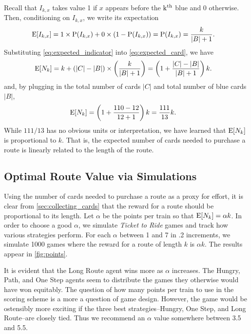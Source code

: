 Recall that $I_{k,x}$ takes value 1 if $x$ appears before the 
$\operatorname{k^{th}}$ blue and 0 otherwise.
Then, conditioning on $I_{k,x}$, we write its expectation
\begin{align} \label{eq:expected_indicator}
    \operatorname{\mathrm{E}}[I_{k,x}] &= 1 \times \operatorname{\mathrm{P}}(I_{k,x})
    + 0 \times (1-\operatorname{\mathrm{P}}(I_{k,x})) 
    =\operatorname{\mathrm{P}}(I_{k,x}) = \frac{k}{|B| + 1}.
\end{align}
Substituting \cref{eq:expected_indicator} into
\cref{eq:expected_card},
we have
\begin{align}
    \operatorname{\mathrm{E}}[N_k] &= k + \left( |C| - |B| \right) 
    \times \left(\frac{k}{|B| + 1}\right)
    = \left(1 + \frac{|C| - |B|}{|B| + 1} \right)k. \nonumber
\end{align}
and, by plugging in the total number of cards
$|C|$ and total number of blue cards $|B|$,
\begin{align}
    \operatorname{\mathrm{E}}[N_k] &= \left(1 + \frac{110 - 12}{12 + 1} \right)k
    = \frac{111}{13}k. \nonumber
\end{align}
While  $111/13$ has no obvious units or interpretation,
we have learned that $\operatorname{\mathrm{E}}[N_k]$ is proportional to $k$.
That is, the expected number of cards needed to
purchase a route is linearly related to the length of the route.

\subsection{Optimal Route Value via Simulations}
\label{sec:alpha}
Using the number of cards needed to purchase a route 
as a proxy for effort, it is clear from \cref{sec:collecting_cards}
that the reward for a route should be proportional to
its length.
Let $\alpha$ be the points per train
so that $\operatorname{\mathrm{E}}[N_k] = \alpha k$.
In order to choose a good $\alpha$, we simulate 
\textit{Ticket to Ride} games and track how various
strategies perform.
For each $\alpha$ between 1 and 7 in .2 increments,
we simulate 1000 games where the reward for a route
of length $k$ is $\alpha k$.
The results appear in \cref{fig:points}.

It is evident that the Long Route agent
wins more as $\alpha$ increases.
The Hungry, Path, and One Step agents seem
to distribute the games they otherwise
would have won equitably.
The question of how many points per train
to use in the scoring scheme is a more a question
of game design.
However, the game would be ostensibly more exciting if the
three best strategies--Hungry, One Step,
and Long Route--are closely tied.
Thus we recommend an $\alpha$ value somewhere
between 3.5 and 5.5.

